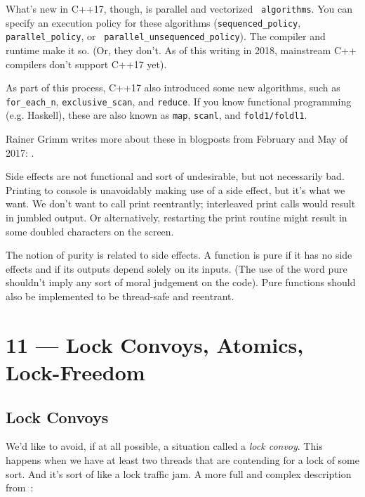 \documentclass[a4paper]{report}
\begin{document}
What's new in C++17, though, is parallel and vectorized {\tt
algorithms}. You can specify an execution policy for these algorithms
({\tt sequenced\_policy}, {\tt parallel\_policy}, or {\tt
parallel\_unsequenced\_policy}). The compiler and runtime make it
so. (Or, they don't. As of this writing in 2018, mainstream C++
compilers don't support C++17 yet).

As part of this process, C++17 also introduced some new algorithms, such as
{\tt for\_each\_n}, {\tt exclusive\_scan}, and {\tt reduce}.
If you know functional programming (e.g. Haskell), these are also known as
{\tt map}, {\tt scanl}, and {\tt fold1/foldl1}.

Rainer Grimm writes more about these in blogposts from February and May of 2017:
\cite{grimm17:_paral_algor_stand_templ_librar} \cite{grimm17:_c}.

Side effects are not functional and sort of undesirable, but not necessarily bad. Printing to console is unavoidably making use of a side effect, but it's what we want. We don't want to call print reentrantly; interleaved print calls would result in jumbled output. Or alternatively, restarting the print routine might result in some doubled characters on the screen.

The notion of purity is related to side effects. A function is pure if it has no side effects and if its outputs depend solely on its inputs. (The use of the word pure shouldn't imply any sort of moral judgement on the code). Pure functions should also be implemented to be thread-safe and reentrant.










\chapter*{11 --- Lock Convoys, Atomics, Lock-Freedom}


\section*{Lock Convoys}

We'd like to avoid, if at all possible, a situation called a \textit{lock convoy}. This happens when we have at least two threads that are contending for a lock of some sort. And it's sort of like a lock traffic jam. A more full and complex description from~\cite{lockconvoys}:
\end{document}
